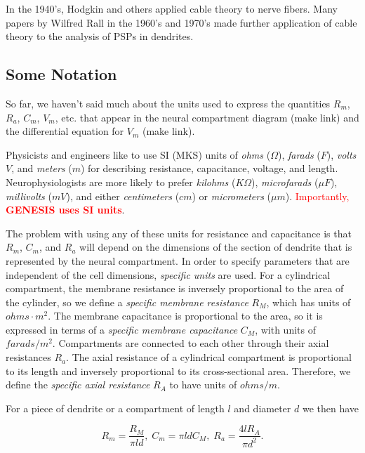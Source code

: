 \documentclass[12pt]{article}
\begin{document}
In the 1940's, Hodgkin and others applied cable theory to nerve fibers. Many papers by Wilfred Rall in the 1960's and 1970's made further application of cable theory to the analysis of PSPs in dendrites.

\subsection*{Some Notation}

So far, we haven't said much about the units used to express the quantities $R_m$, $R_a$, $C_m$, $V_m$, etc. that appear in the neural compartment diagram (make link) and the differential equation for $V_m$ (make link).

Physicists and engineers like to use SI (MKS) units of {\it ohms} ($\Omega$),  {\it farads} ($F$),  {\it volts} {$V$}, and  {\it meters} ($m$) for describing resistance, capacitance, voltage, and length. Neurophysiologists are more likely to prefer  {\it kilohms} ($K\Omega$),  {\it microfarads} ($\mu F$),  {\it millivolts} ($mV$), and either  {\it centimeters} ($cm$) or  {\it micrometers} ($\mu m$). \textcolor{red}{Importantly, {\bf GENESIS uses SI units}}.

The problem with using any of these units for resistance and capacitance is that $R_m$, $C_m$, and $R_a$ will depend on the dimensions of the section of dendrite that is represented by the neural compartment. In order to specify parameters that are independent of the cell dimensions, {\it specific units} are used. For a cylindrical compartment, the membrane resistance is inversely proportional to the area of the cylinder, so we define a {\it specific membrane resistance} $R_M$, which has units of $ohms\cdot m^2$. The membrane capacitance is proportional to the area, so it is expressed in terms of a {\it specific membrane capacitance} $C_M$, with units of $farads/m^2$. Compartments are connected to each other through their axial resistances $R_a$. The axial resistance of a cylindrical compartment is proportional to its length and inversely proportional to its cross-sectional area. Therefore, we define the {\it specific axial resistance} $R_A$ to have units of $ohms/m$.

For a piece of dendrite or a compartment of length $l$ and diameter $d$ we then have

\begin{displaymath}
	R_{m} = \frac{R_M}{\pi l d},\; C_{m} = \pi l d C_M,\; R_{a}= \frac{4 l R_A}{\pi d^{2}}.
\end{displaymath}
\end{document}
